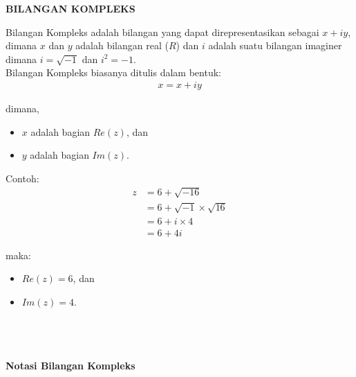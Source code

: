 \documentclass{article}
\begin{document}
    \begin{center}
        \textbf{BILANGAN KOMPLEKS}
    \end{center}

    Bilangan Kompleks adalah bilangan yang dapat direpresentasikan sebagai \( x + iy \), dimana $x$ dan $y$ adalah bilangan real ($R$) dan $i$ adalah suatu bilangan imaginer dimana \( i = \sqrt{-1} \) dan \( i^2 = -1 \).\\

    Bilangan Kompleks biasanya ditulis dalam bentuk:
    \begin{align}
        x = x + iy
    \end{align}

    \>dimana,
    \begin{itemize}
        \item $x$ adalah bagian $Re(z)$, dan
        \item $y$ adalah bagian $Im(z)$. \\
    \end{itemize}
    
    Contoh:
    \begin{align}
        z & = 6 + \sqrt{-16} 
        \nonumber\\
        & = 6 + \sqrt{-1} \times \sqrt{16}
        \nonumber\\
        & = 6 + i \times 4
        \nonumber\\
        & = 6 + 4i
    \end{align}

    maka:
    \begin{itemize}
        \item $Re(z) = 6$, dan
        \item $Im(z) = 4$. \\ \\ \\ \\
    \end{itemize}

    \begin{center}
        \textbf{Notasi Bilangan Kompleks}
    \end{center}

    \\ \\ \\ \\
\end{document}

